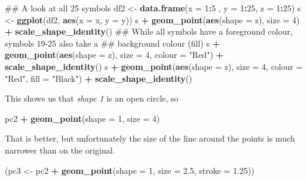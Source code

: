 \documentclass[]{book}
\newenvironment{Shaded}{\begin{snugshade}}{\end{snugshade}}
\newcommand{\KeywordTok}[1]{\textcolor[rgb]{0.13,0.29,0.53}{\textbf{#1}}}
\newcommand{\DataTypeTok}[1]{\textcolor[rgb]{0.13,0.29,0.53}{#1}}
\newcommand{\DecValTok}[1]{\textcolor[rgb]{0.00,0.00,0.81}{#1}}
\newcommand{\FloatTok}[1]{\textcolor[rgb]{0.00,0.00,0.81}{#1}}
\newcommand{\StringTok}[1]{\textcolor[rgb]{0.31,0.60,0.02}{#1}}
\newcommand{\OperatorTok}[1]{\textcolor[rgb]{0.81,0.36,0.00}{\textbf{#1}}}
\newcommand{\NormalTok}[1]{#1}
\begin{document}
\begin{Shaded}
\begin{Highlighting}[]
\NormalTok{## A look at all 25 symbols}
\NormalTok{df2 <-}\StringTok{ }\KeywordTok{data.frame}\NormalTok{(}\DataTypeTok{x =} \DecValTok{1}\OperatorTok{:}\DecValTok{5}\NormalTok{ , }\DataTypeTok{y =} \DecValTok{1}\OperatorTok{:}\DecValTok{25}\NormalTok{, }\DataTypeTok{z =} \DecValTok{1}\OperatorTok{:}\DecValTok{25}\NormalTok{)}
\NormalTok{s <-}\StringTok{ }\KeywordTok{ggplot}\NormalTok{(df2, }\KeywordTok{aes}\NormalTok{(}\DataTypeTok{x =}\NormalTok{ x, }\DataTypeTok{y =}\NormalTok{ y))}
\NormalTok{s }\OperatorTok{+}\StringTok{ }\KeywordTok{geom_point}\NormalTok{(}\KeywordTok{aes}\NormalTok{(}\DataTypeTok{shape =}\NormalTok{ z), }\DataTypeTok{size =} \DecValTok{4}\NormalTok{) }\OperatorTok{+}\StringTok{ }\KeywordTok{scale_shape_identity}\NormalTok{()}
\NormalTok{## While all symbols have a foreground colour, symbols 19-25 also take a}
\NormalTok{## background colour (fill)}
\NormalTok{s }\OperatorTok{+}\StringTok{ }\KeywordTok{geom_point}\NormalTok{(}\KeywordTok{aes}\NormalTok{(}\DataTypeTok{shape =}\NormalTok{ z), }\DataTypeTok{size =} \DecValTok{4}\NormalTok{, }\DataTypeTok{colour =} \StringTok{"Red"}\NormalTok{) }\OperatorTok{+}
\StringTok{  }\KeywordTok{scale_shape_identity}\NormalTok{()}
\NormalTok{s }\OperatorTok{+}\StringTok{ }\KeywordTok{geom_point}\NormalTok{(}\KeywordTok{aes}\NormalTok{(}\DataTypeTok{shape =}\NormalTok{ z), }\DataTypeTok{size =} \DecValTok{4}\NormalTok{, }\DataTypeTok{colour =} \StringTok{"Red"}\NormalTok{, }\DataTypeTok{fill =} \StringTok{"Black"}\NormalTok{) }\OperatorTok{+}
\StringTok{  }\KeywordTok{scale_shape_identity}\NormalTok{()}
\end{Highlighting}
\end{Shaded}

This shows us that \emph{shape 1} is an open circle, so

\begin{Shaded}
\begin{Highlighting}[]
\NormalTok{pc2 }\OperatorTok{+}
\StringTok{  }\KeywordTok{geom_point}\NormalTok{(}\DataTypeTok{shape =} \DecValTok{1}\NormalTok{, }\DataTypeTok{size =} \DecValTok{4}\NormalTok{)}
\end{Highlighting}
\end{Shaded}

That is better, but unfortunately the size of the line around the points
is much narrower than on the original.

\begin{Shaded}
\begin{Highlighting}[]
\NormalTok{(pc3 <-}\StringTok{ }\NormalTok{pc2 }\OperatorTok{+}\StringTok{ }\KeywordTok{geom_point}\NormalTok{(}\DataTypeTok{shape =} \DecValTok{1}\NormalTok{, }\DataTypeTok{size =} \FloatTok{2.5}\NormalTok{, }\DataTypeTok{stroke =} \FloatTok{1.25}\NormalTok{))}
\end{Highlighting}
\end{Shaded}
\end{document}
